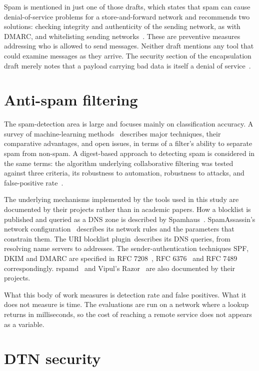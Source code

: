 Spam is mentioned in just one of those drafts, which states that spam can cause denial-of-service problems for a store-and-forward network and recommends two solutions: checking integrity and authenticity of the sending network, as with DMARC, and whitelisting sending networks~\cite{johnson-dtn-interplanetary-smtp-01}. These are preventive measures addressing who is allowed to send messages. Neither draft mentions any tool that could examine messages as they arrive. The security section of the encapsulation draft merely notes that a payload carrying bad data is itself a denial of service~\cite{blanchet-dtn-email-over-bp-06}.


\section{Anti-spam filtering}

The spam-detection area is large and focuses mainly on classification accuracy. A survey of machine-learning methods~\cite{dada-mlspam} describes major techniques, their comparative advantages, and open issues, in terms of a filter's ability to separate spam from non-spam. A digest-based approach to detecting spam is considered in the same terms: the algorithm underlying collaborative filtering was tested against three criteria, its robustness to automation, robustness to attacks, and false-positive rate~\cite{damiani-digest}.

The underlying mechanisms implemented by the tools used in this study are documented by their projects rather than in academic papers. How a blocklist is published and queried as a DNS zone is described by Spamhaus~\cite{spamhaus}. SpamAssassin's network configuration~\cite{saconf} describes its network rules and the parameters that constrain them. The URI blocklist plugin~\cite{sauridnsbl}describes its DNS queries, from resolving name servers to addresses. The sender-authentication techniques SPF, DKIM and DMARC are specified in RFC 7208~\cite{rfc7208}, RFC 6376~\cite{rfc6376} and RFC 7489~\cite{rfc7489} correspondingly. rspamd~\cite{rspamd} and Vipul's Razor~\cite{razor} are also documented by their projects.

What this body of work measures is detection rate and false positives. What it does
not measure is time. The evaluations are run on a network where a lookup returns in
milliseconds, so the cost of reaching a remote service does not appears as a variable.

\section{DTN security}

